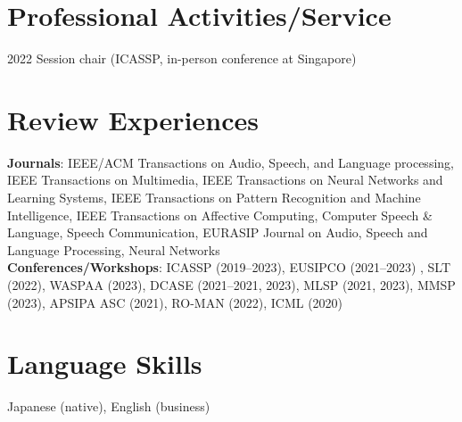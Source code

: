 \documentclass[letterpaper,11pt]{article}
\begin{document}
\section{Professional Activities/Service}
2022 Session chair (ICASSP, in-person conference at Singapore)
    
\section{Review Experiences}
 \begin{itemize}[leftmargin=0.15in, label={}]
    \small{\item{
     \textbf{Journals}{: IEEE/ACM Transactions on Audio, Speech, and Language processing, IEEE Transactions on Multimedia, IEEE Transactions on Neural Networks and Learning Systems, IEEE Transactions on Pattern Recognition and Machine Intelligence, IEEE Transactions on Affective Computing, Computer Speech \& Language, Speech Communication, EURASIP Journal on Audio, Speech and Language Processing, Neural Networks} \\
     \textbf{Conferences/Workshops}{: ICASSP (2019--2023), EUSIPCO (2021--2023) , SLT (2022), WASPAA (2023), DCASE (2021--2021, 2023), MLSP (2021, 2023), MMSP (2023), APSIPA ASC (2021), RO-MAN (2022), ICML (2020)}
    }}
 \end{itemize}
%

\section{Language Skills}
 \begin{itemize}[leftmargin=0.15in, label={}]
    \small{\item{Japanese (native), English (business)}}
 \end{itemize}

\end{document}
